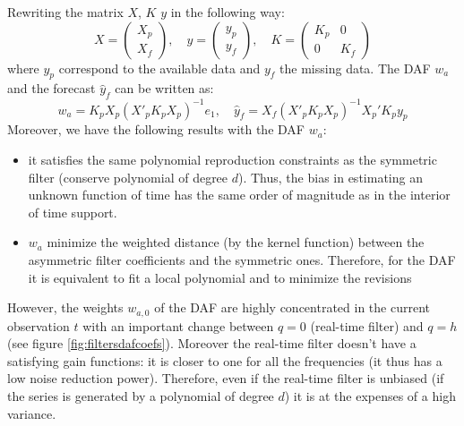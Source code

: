 \documentclass[
  12pt,
  ,
  a4paper]{article}
\newcommand\1{\mathds{1}}
\begin{document}
Rewriting the matrix \(X\), \(K\) \(y\) in the following way:
\[
X=\begin{pmatrix}X_{p}\\
X_{f}
\end{pmatrix},\quad y=\begin{pmatrix}y_{p}\\
y_{f}
\end{pmatrix},\quad K=\begin{pmatrix}K_{p} & 0\\
0 & K_{f}
\end{pmatrix}
\]
where \(y_{p}\) correspond to the available data and \(y_{f}\) the missing data.
The DAF \(w_a\) and the forecast \(\hat{y}_{f}\) can be written as:
\[
w_{a}=K_{p}X_{p}(X'_{p}K_{p}X_{p})^{-1}e_{1},
\quad
\hat{y}_{f}=X_{f}(X'_{p}K_{p}X_{p})^{-1}X_{p}'K_{p}y_{p}
\]
Moreover, we have the following results with the DAF \(w_a\):

\begin{itemize}
\item
  it satisfies the same polynomial reproduction constraints as the symmetric filter (conserve polynomial of degree \(d\)).
  Thus, the bias in estimating an unknown function of time has the same order of magnitude as in the interior of time support.
\item
  \(w_a\) minimize the weighted distance (by the kernel function) between the asymmetric filter coefficients and the symmetric ones.
  Therefore, for the DAF it is equivalent to fit a local polynomial and to minimize the revisions
\end{itemize}

However, the weights \(w_{a,0}\) of the DAF are highly concentrated in the current observation \(t\) with an important change between \(q=0\) (real-time filter) and \(q=h\) (see figure \ref{fig:filtersdafcoefs}).
Moreover the real-time filter doesn't have a satisfying gain functions: it is closer to one for all the frequencies (it thus has a low noise reduction power).
Therefore, even if the real-time filter is unbiased (if the series is generated by a polynomial of degree \(d\)) it is at the expenses of a high variance.
\end{document}
